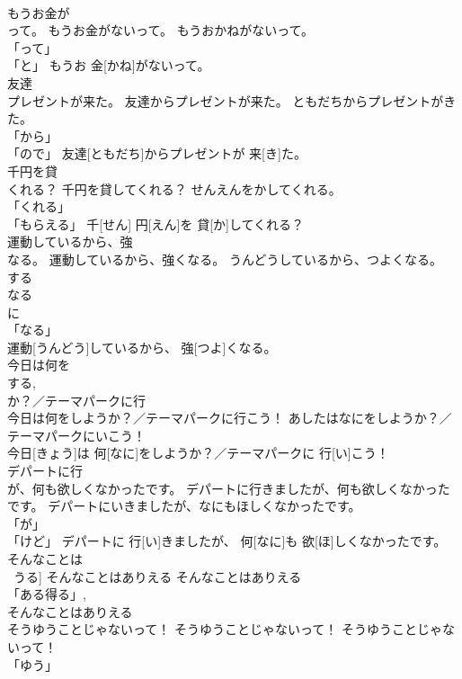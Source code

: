 \documentclass[8pt]{extreport}
\begin{document}
\begin{CJK}{UTF8}{min}
\\	もうお金が
\\	って。	もうお金がないって。	もうおかねがないって。	
\\	「って」 
\\	「と」	もうお 金[かね]がないって。		
\\	友達
\\	プレゼントが来た。	友達からプレゼントが来た。	ともだちからプレゼントがきた。	
\\	「から」 
\\	「ので」	友達[ともだち]からプレゼントが 来[き]た。		
\\	千円を貸
\\	くれる？	千円を貸してくれる？	せんえんをかしてくれる。	
\\	「くれる」 
\\	「もらえる」	千[せん] 円[えん]を 貸[か]してくれる？		
\\	運動しているから、強
\\	なる。	運動しているから、強くなる。	うんどうしているから、つよくなる。	
\\	する 
\\	なる 
\\	に 
\\	「なる」 
\\	運動[うんどう]しているから、 強[つよ]くなる。		
\\	今日は何を
\\	する, 
\\	か？／テーマパークに行
\\	今日は何をしようか？／テーマパークに行こう！	あしたはなにをしようか？／テーマパークにいこう！	
\\	今日[きょう]は 何[なに]をしようか？／テーマパークに 行[い]こう！		
\\	デパートに行
\\	が、何も欲しくなかったです。	デパートに行きましたが、何も欲しくなかったです。	デパートにいきましたが、なにもほしくなかったです。	
\\	「が」 
\\	「けど」	デパートに 行[い]きましたが、 何[なに]も 欲[ほ]しくなかったです。		
\\	そんなことは
\\	~うる]	そんなことはありえる	そんなことはありえる	
\\	「ある得る」, 
\\	そんなことはありえる		
\\	そうゆうことじゃないって！	そうゆうことじゃないって！	そうゆうことじゃないって！	
\\	「ゆう」 

\end{CJK}
\end{document}
